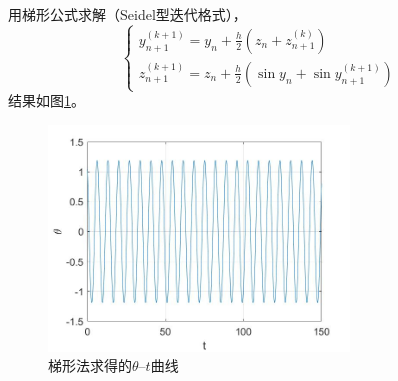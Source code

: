 \documentclass[10pt,a4paper]{article}
\begin{document}
用梯形公式求解（Seidel型迭代格式），
\[
\left\{\begin{array}{l}
y_{n+1}^{(k+1)}=y_n+\frac{h}{2}(z_n+z_{n+1}^{(k)})\\
z_{n+1}^{(k+1)}=z_n+\frac{h}{2}(\sin y_n+\sin y_{n+1}^{(k+1)})
\end{array}\right.
\]
结果如图\ref{3_2}。
\begin{figure}[h]
\centering
\includegraphics[width=8cm]{Trapezoid_3.jpg}
\caption{梯形法求得的$\theta$--$t$曲线}\label{3_2}
\end{figure}
\end{document}
